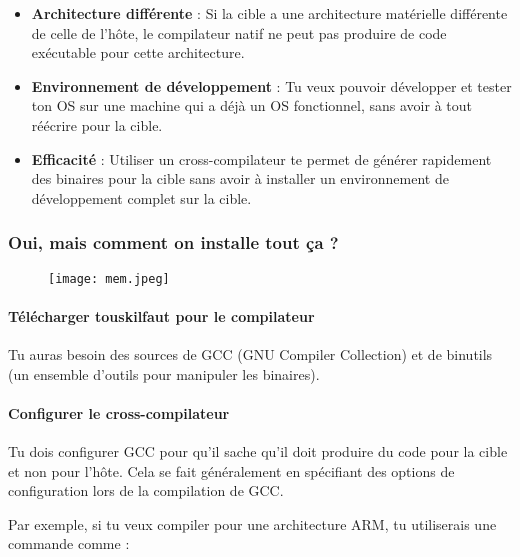\documentclass{article}
\begin{document}
\begin{itemize}
    \item \textbf{Architecture différente} : Si la cible a une architecture matérielle différente de celle de l'hôte, le compilateur natif ne peut pas produire de code exécutable pour cette architecture.
    
    \item \textbf{Environnement de développement} : Tu veux pouvoir développer et tester ton OS sur une machine qui a déjà un OS fonctionnel, sans avoir à tout réécrire pour la cible.
    
    \item \textbf{Efficacité} : Utiliser un cross-compilateur te permet de générer rapidement des binaires pour la cible sans avoir à installer un environnement de développement complet sur la cible.
\end{itemize}

\subsubsection{Oui, mais comment on installe tout ça ?}

\begin{figure}[h!] %
    \centering %
    \texttt{[image: mem.jpeg]} %
    \label{fig:logo} %
\end{figure}
\paragraph{Télécharger touskilfaut pour le compilateur\\}
Tu auras besoin des sources de GCC (GNU Compiler Collection) et de binutils (un ensemble d'outils pour manipuler les binaires).

\paragraph{Configurer le cross-compilateur\\}
Tu dois configurer GCC pour qu'il sache qu'il doit produire du code pour la cible et non pour l'hôte. Cela se fait généralement en spécifiant des options de configuration lors de la compilation de GCC.

Par exemple, si tu veux compiler pour une architecture ARM, tu utiliserais une commande comme :
\end{document}
